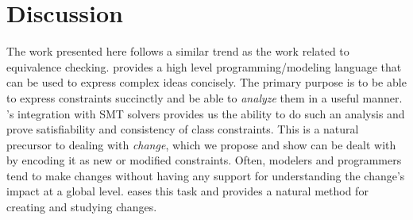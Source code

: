 \section{Discussion}
\label{sec:discussion}

The work presented here follows a similar trend as the work related to
equivalence checking. \Klang{} provides a high level
programming/modeling language that can be used to express complex
ideas concisely. The primary purpose is to be able to express
constraints succinctly and be able to {\em analyze} them in a useful
manner. \Klang's integration with SMT solvers provides us the ability
to do such an analysis and prove satisfiability and consistency of
class constraints. This is a natural precursor to dealing with
{\em change}, which we propose and show can be dealt with by encoding
it as new or modified constraints. Often, modelers and programmers
tend to make changes without having any support for understanding the
change's impact at a global level. \Klang{} eases this task and
provides a natural method for creating and studying
changes. 



